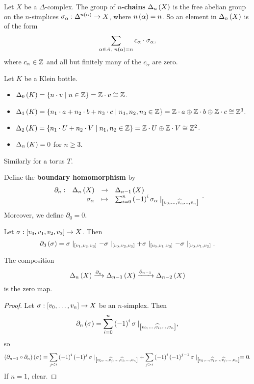 Let $ X $ be a $ \Delta $-complex. The group of \textbf{$ n $-chains} $ \Delta_n\rb{X} $ is the free abelian group on the $ n $-simplices $ \sigma_\alpha : \Delta^{n\rb{\alpha}} \to X $, where $ n\rb{\alpha} = n $. So an element in $ \Delta_n\rb{X} $ is of the form
$$ \sum_{\alpha \in A, \ n\rb{\alpha} = n} c_\alpha \cdot \sigma_\alpha, $$
where $ c_\alpha \in \Z $ and all but finitely many of the $ c_\alpha $ are zero.

\begin{example*}
Let $ K $ be a Klein bottle.
\begin{itemize}
\item $ \Delta_0\rb{K} = \cb{n \cdot v \mid n \in \Z} = \Z \cdot v \cong \Z $.
\item $ \Delta_1\rb{K} = \cb{n_1 \cdot a + n_2 \cdot b + n_3 \cdot c \mid n_1, n_2, n_3 \in \Z} = \Z \cdot a \oplus \Z \cdot b \oplus \Z \cdot c \cong \Z^3 $.
\item $ \Delta_2\rb{K} = \cb{n_1 \cdot U + n_2 \cdot V \mid n_1, n_2 \in \Z} = \Z \cdot U \oplus \Z \cdot V \cong \Z^2 $.
\item $ \Delta_n\rb{K} = 0 $ for $ n \ge 3 $.
\end{itemize}
Similarly for a torus $ T $.
\end{example*}


Define the \textbf{boundary homomorphism} by
$$ \function[\partial_n]{\Delta_n\rb{X}}{\Delta_{n - 1}\rb{X}}{\sigma_\alpha}{\sum_{i = 0}^n \rb{-1}^i\sigma_\alpha \mid_{\sb{v_0, \dots, \widehat{v_i}, \dots, v_n}}}. $$
Moreover, we define $ \partial_0 = 0 $.

\begin{example*}
Let $ \sigma : \sb{v_0, v_1, v_2, v_3} \to X $. Then
$$ \partial_3\rb{\sigma} = \sigma \mid_{\sb{v_1, v_2, v_3}} - \sigma \mid_{\sb{v_0, v_2, v_3}} + \sigma \mid_{\sb{v_0, v_1, v_3}} - \sigma \mid_{\sb{v_0, v_1, v_2}}. $$
\end{example*}

\begin{lemma}
\label{lem:2.1}
The composition
$$ \Delta_n\rb{X} \xrightarrow{\partial_n} \Delta_{n - 1}\rb{X} \xrightarrow{\partial_{n - 1}} \Delta_{n - 2}\rb{X} $$
is the zero map.
\end{lemma}

\begin{proof}
Let $ \sigma : \sb{v_0, \dots, v_n} \to X $ be an $ n $-simplex. Then
$$ \partial_n\rb{\sigma} = \sum_{i = 0}^n \rb{-1}^i\sigma \mid_{\sb{v_0, \dots, \widehat{v_i}, \dots, v_n}}, $$
so
$$ \rb{\partial_{n - 1} \circ \partial_n}\rb{\sigma} = \sum_{j < i} \rb{-1}^i\rb{-1}^j\sigma \mid_{\sb{v_0, \dots, \widehat{v_j}, \dots, \widehat{v_i}, \dots, v_n}} + \sum_{j > i} \rb{-1}^i\rb{-1}^{j - 1}\sigma \mid_{\sb{v_0, \dots, \widehat{v_i}, \dots, \widehat{v_j}, \dots, v_n}} = 0. $$
If $ n = 1 $, clear.
\end{proof}

